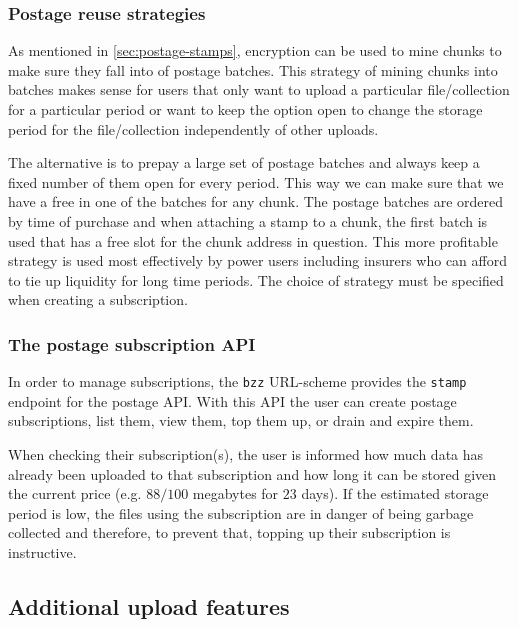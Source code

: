 \subsubsection{Postage reuse strategies}

As mentioned in \ref{sec:postage-stamps}, encryption can be used to mine chunks to make sure they fall into  of postage batches. This strategy of mining chunks into batches makes sense for users that only want to upload a particular file/collection for a particular period or want to keep the option open to change the storage period for the file/collection independently of other uploads.

The alternative is to prepay a large set of postage batches and always keep a fixed number of them open for every period. This way we can make sure that we have a free  in one of the batches for any chunk. The postage batches are ordered by time of purchase and when attaching a stamp to a chunk, the first batch is used that has a free slot for the chunk address in question. This more profitable strategy is used most effectively by power users including insurers who can afford to tie up liquidity for long time periods. The choice of strategy must be specified when creating a subscription.

\subsubsection{The postage subscription API}

In order to manage subscriptions, the \lstinline{bzz} URL-scheme provides the \lstinline{stamp} endpoint for the postage API. With this API the user can create postage subscriptions, list them, view them, top them up, or drain and expire them. 

When checking their subscription(s), the user is informed how much data has already been uploaded to that subscription and how long it can be stored given the current price (e.g. $88/100$ megabytes for $23$ days). If the estimated storage period is low, the files using the subscription are in danger of being garbage collected and therefore, to prevent that, topping up their subscription is instructive.


\subsection{Additional upload features \statusgreen}\label{sec:features}

